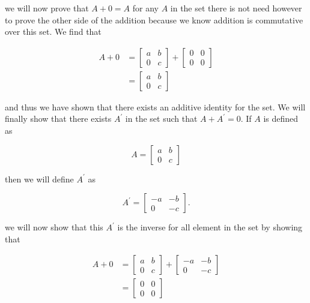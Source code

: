 \documentclass{article}
\begin{document}
    \noindent we will now prove that $A + 0 = A$ for any $A$ in the set there is not need however to prove the other side of the addition because we know addition is commutative over this set. We find that
    
    \begin{equation*}
      \begin{split}
        A + 0 &= 
          \begin{bmatrix}
            a & b\\
            0 & c
          \end{bmatrix} +
          \begin{bmatrix}
            0 & 0\\
            0 & 0
          \end{bmatrix}\\
         &= \begin{bmatrix}
          a & b\\
          0 & c
        \end{bmatrix}
      \end{split}
    \end{equation*}
    
    \noindent and thus we have shown that there exists an additive identity for the set. We will finally show that there exists $A^{\prime}$ in the set such that $A+A^{\prime} = 0$. If $A$ is defined as

    \[
      A = \begin{bmatrix}
        a & b\\
        0 & c
      \end{bmatrix}
    \]

    \noindent then we will define $A^{\prime}$ as

    \[
      A^{\prime} = \begin{bmatrix}
        -a & -b\\
        0 & -c
      \end{bmatrix}.
    \]
    
    \noindent we will now show that this $A^{\prime}$ is the inverse for all element in the set by showing that

    \begin{equation*}
      \begin{split}
        A + 0 &= 
          \begin{bmatrix}
            a & b\\
            0 & c
          \end{bmatrix} +
          \begin{bmatrix}
            -a & -b\\
            0 & -c
          \end{bmatrix}\\
         &= \begin{bmatrix}
          0 & 0\\
          0 & 0
        \end{bmatrix}
      \end{split}
    \end{equation*}
\end{document}
